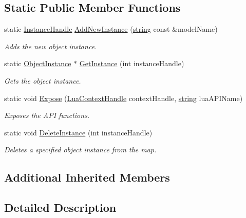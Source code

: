 \subsection*{Static Public Member Functions}
\begin{DoxyCompactItemize}
\item 
static \hyperlink{_lua_object_instance_manager_8h_a317edebd09c13058779c942342947a0d}{Instance\+Handle} \hyperlink{class_lua_object_instance_manager_a04a5deef8c67926a46893bff2fc838be}{Add\+New\+Instance} (\hyperlink{_types_8h_ad453f9f71ce1f9153fb748d6bb25e454}{string} const \&model\+Name)
\begin{DoxyCompactList}\small\item\em Adds the new object instance. \end{DoxyCompactList}\item 
static \hyperlink{class_object_instance}{Object\+Instance} $\ast$ \hyperlink{class_lua_object_instance_manager_a62e842ba254f119752b29e8b5d56010f}{Get\+Instance} (int instance\+Handle)
\begin{DoxyCompactList}\small\item\em Gets the object instance. \end{DoxyCompactList}\item 
static void \hyperlink{class_lua_object_instance_manager_a5ea85051a2cdc270393d5f4b012c9d46}{Expose} (\hyperlink{_lua_context_8h_a2ffcc2d3ed21165072a1d7b61259bf14}{Lua\+Context\+Handle} context\+Handle, \hyperlink{_types_8h_ad453f9f71ce1f9153fb748d6bb25e454}{string} lua\+A\+P\+I\+Name)
\begin{DoxyCompactList}\small\item\em Exposes the A\+PI functions. \end{DoxyCompactList}\item 
static void \hyperlink{class_lua_object_instance_manager_a15f73fd9cd4192f3010947ae1c77d579}{Delete\+Instance} (int instance\+Handle)
\begin{DoxyCompactList}\small\item\em Deletes a specified object instance from the map. \end{DoxyCompactList}\end{DoxyCompactItemize}
\subsection*{Additional Inherited Members}


\subsection{Detailed Description}


